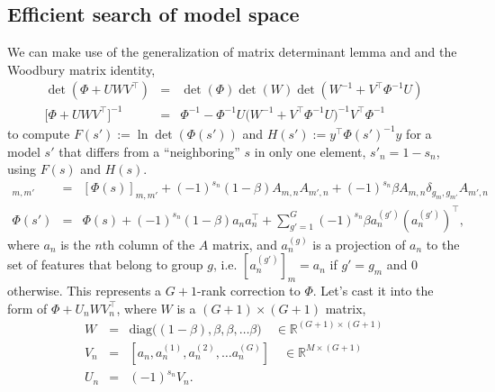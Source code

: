 \documentclass[letter,10pt,oneside]{article}
\newcommand{\ba}{\begin{eqnarray*}}
\newcommand{\ea}{\end{eqnarray*}}
\newcommand{\+}{^\dagger}
\newcommand{\T}{^\top}
\begin{document}
\subsection{Efficient search of model space}
We can make use of the generalization of matrix determinant lemma and and the Woodbury matrix identity,
\ba
  \det(\Phi + UWV\T) &=& \det(\Phi)\det(W)\det(W^{-1} + V\T \Phi^{-1} U)  \\
  \Big[\Phi + UWV\T\Big]^{-1} &=& \Phi^{-1} - \Phi^{-1}U \Big(W^{-1} + V\T \Phi^{-1}U\Big)^{-1} V\T \Phi^{-1}
\ea
to compute $F(s'):=\ln \det(\Phi(s'))$ and $H(s'):=y\T \Phi(s')^{-1}y$ for a model $s'$ that differs from a ``neighboring'' $s$ in only one element, $s'_n = 1 - s_n$, using $F(s)$ and $H(s)$.
\ba
  [\Phi(s')]_{m,m'} &=& [\Phi(s)]_{m,m'} + (-1)^{s_n}(1-\beta)A_{m,n} A_{m',n} + (-1)^{s_n} \beta A_{m,n} \delta_{g_m, g_{m'}} A_{m',n} \\
  \Phi(s') &=& \Phi(s) + (-1)^{s_n}(1-\beta)a_n a_n\T + \sum_{g'=1}^G (-1)^{s_n} \beta a_n^{(g')} (a_n^{(g')})\T,
\ea
where $a_n$ is the $n$th column of the $A$ matrix, and $a_n^{(g)}$ is a projection of $a_n$ to the set of features that belong to group $g$, i.e. $[a_n^{(g')}]_m = a_n$ if $g' = g_m$ and $0$ otherwise. This represents a $G+1$-rank correction to $\Phi$.  Let's cast it into the form of $\Phi + U_n W V_n\T$, where $W$ is a $(G+1)\times (G+1)$ matrix,
\ba
  W &=& \text{diag}\Big((1-\beta), \beta, \beta, \ldots \beta\Big) \quad \in \mathds{R}^{(G+1)\times (G+1)}\\
  V_n &=& [a_n, a_n^{(1)}, a_n^{(2)}, \ldots a_n^{(G)}] \quad \in \mathds{R}^{M\times (G+1)} \\
  U_n &=& (-1)^{s_n} V_{n}.
\ea
\end{document}
